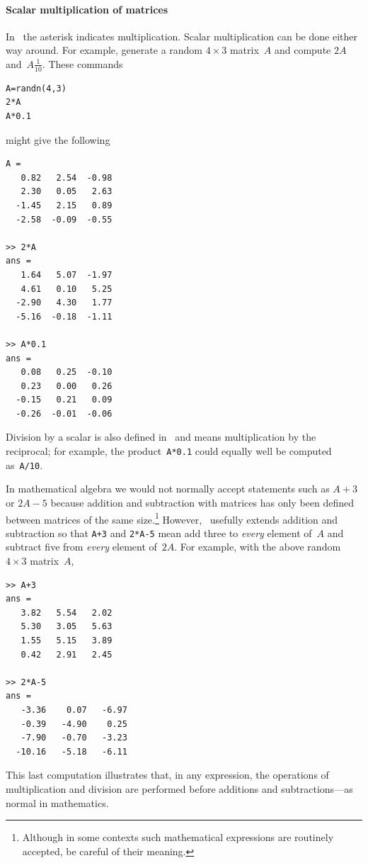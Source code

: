 \paragraph{Scalar multiplication of matrices}
In \script\ the asterisk indicates multiplication.
Scalar multiplication can be done either way around.
For example, generate a random \(4\times 3\) matrix~\(A\) and compute \(2A\) and~\(A\frac1{10}\).
These commands 
\begin{verbatim}
A=randn(4,3)
2*A
A*0.1
\end{verbatim}
\setbox\ajrqrbox\hbox{}%
\marginajrbox%
might give the following \twodp
\begin{verbatim}
A =
   0.82   2.54  -0.98
   2.30   0.05   2.63
  -1.45   2.15   0.89
  -2.58  -0.09  -0.55

>> 2*A
ans =
   1.64   5.07  -1.97
   4.61   0.10   5.25
  -2.90   4.30   1.77
  -5.16  -0.18  -1.11

>> A*0.1
ans =
   0.08   0.25  -0.10
   0.23   0.00   0.26
  -0.15   0.21   0.09
  -0.26  -0.01  -0.06
\end{verbatim}
Division by a scalar is also defined in \script\ and means multiplication by the reciprocal; for example, the product~\verb|A*0.1| could equally well be computed as~\verb|A/10|.

In mathematical algebra we would not normally accept statements such as \(A+3\) or \(2A-5\) because addition and subtraction with matrices has only been defined between matrices of the same size.\footnote{Although in some contexts such mathematical expressions are routinely accepted, be careful of their meaning.}
However, \script\ usefully extends addition and subtraction so that \verb|A+3| and \verb|2*A-5| mean add three to \emph{every} element of~\(A\) and subtract five from \emph{every} element of~\(2A\). 
For example, with the above random \(4\times3\) matrix~\(A\),
\begin{verbatim}
>> A+3
ans =
   3.82   5.54   2.02
   5.30   3.05   5.63
   1.55   5.15   3.89
   0.42   2.91   2.45

>> 2*A-5
ans =
   -3.36    0.07   -6.97
   -0.39   -4.90    0.25
   -7.90   -0.70   -3.23
  -10.16   -5.18   -6.11
\end{verbatim}
This last computation illustrates that, in any expression, the operations of multiplication and division are performed before additions and subtractions---as normal in mathematics.


